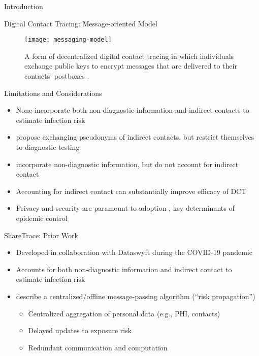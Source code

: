 \documentclass[11pt]{beamer}
\begin{document}
\begin{section}{Introduction}
\begin{frame}{Digital Contact Tracing: Message-oriented Model}
\begin{figure}
  \centering
  \texttt{[image: messaging-model]}
  \caption[Message-oriented model]{A form of decentralized digital contact tracing in which individuals exchange public keys to encrypt messages that are delivered to their contacts' postboxes \cite{Reichert2021}.}
\end{figure}
\end{frame}

\begin{frame}{Limitations and Considerations}
\begin{itemize}
  \item None incorporate both non-diagnostic information and indirect contacts to estimate infection risk
  \pause
  \item \citet{Cherini2023} propose exchanging pseudonyms of indirect contacts, but restrict themselves to diagnostic testing
  \pause
  \item \citet{Gupta2023} incorporate non-diagnostic information, but do not account for indirect contact
  \pause
  \item Accounting for indirect contact can substantially improve efficacy of DCT \citep{PozoMartin2023}
  \pause
  \item Privacy and security are paramount to adoption \citep{Oyibo2022, Afroogh2022}, key determinants of epidemic control \citep{PozoMartin2023}
\end{itemize}
\end{frame}

\begin{frame}{ShareTrace: Prior Work}
\begin{itemize}
  \item Developed in collaboration with Dataswyft during the COVID-19 pandemic \citep{Ayday2020}
  \pause
  \item Accounts for both non-diagnostic information and indirect contact to estimate infection risk
  \pause
  \item \citet{Ayday2021} describe a centralized/offline message-passing algorithm (``risk propagation'')
    \pause
    \begin{itemize}
      \item Centralized aggregation of personal data (e.g., PHI, contacts)
      \pause
      \item Delayed updates to exposure risk
      \pause
      \item Redundant communication and computation
    \end{itemize}
\end{itemize}
\end{frame}


\end{section}
\end{document}
